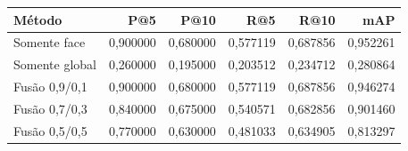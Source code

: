 \begin{tabular}{lrrrrr}
\toprule
Método & P@5 & P@10 & R@5 & R@10 & mAP \\
\midrule
Somente face & 0,900000 & 0,680000 & 0,577119 & 0,687856 & 0,952261 \\
Somente global & 0,260000 & 0,195000 & 0,203512 & 0,234712 & 0,280864 \\
Fusão 0,9/0,1 & 0,900000 & 0,680000 & 0,577119 & 0,687856 & 0,946274 \\
Fusão 0,7/0,3 & 0,840000 & 0,675000 & 0,540571 & 0,682856 & 0,901460 \\
Fusão 0,5/0,5 & 0,770000 & 0,630000 & 0,481033 & 0,634905 & 0,813297 \\
\bottomrule
\end{tabular}
